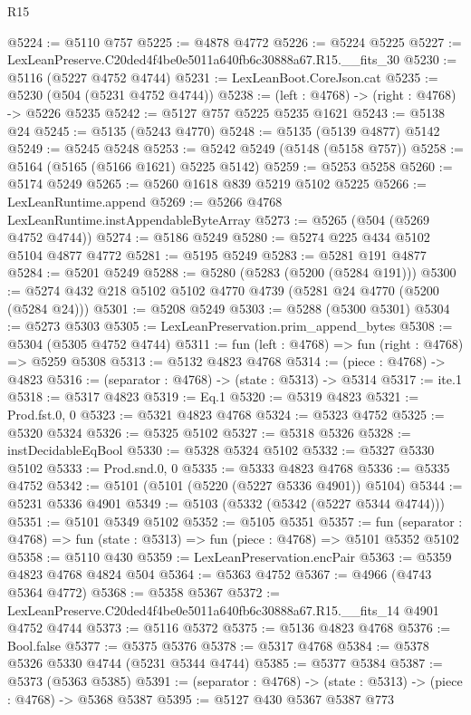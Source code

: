 \begin{lexlean}{R15}
\begin{coremodule}
{{{{{{{{{{{@5224 := @5110 @757
@5225 := @4878 @4772
@5226 := @5224 @5225
@5227 := LexLeanPreserve.C20ded4f4be0e5011a640fb6c30888a67.R15.__fits_30
@5230 := @5116 (@5227 @4752 @4744)
@5231 := LexLeanBoot.CoreJson.cat
@5235 := @5230 (@504 (@5231 @4752 @4744))
@5238 := (left : @4768) -> (right : @4768) -> @5226 @5235
@5242 := @5127 @757 @5225 @5235 @1621
@5243 := @5138 @24
@5245 := @5135 (@5243 @4770)
@5248 := @5135 (@5139 @4877) @5142
@5249 := @5245 @5248
@5253 := @5242 @5249 (@5148 (@5158 @757))
@5258 := @5164 (@5165 (@5166 @1621) @5225 @5142)
@5259 := @5253 @5258
@5260 := @5174 @5249
@5265 := @5260 @1618 @839 @5219 @5102 @5225
@5266 := LexLeanRuntime.append
@5269 := @5266 @4768 LexLeanRuntime.instAppendableByteArray
@5273 := @5265 (@504 (@5269 @4752 @4744))
@5274 := @5186 @5249
@5280 := @5274 @225 @434 @5102 @5104 @4877 @4772
@5281 := @5195 @5249
@5283 := @5281 @191 @4877
@5284 := @5201 @5249
@5288 := @5280 (@5283 (@5200 (@5284 @191)))
@5300 := @5274 @432 @218 @5102 @5102 @4770 @4739 (@5281 @24 @4770 (@5200 (@5284 @24)))
@5301 := @5208 @5249
@5303 := @5288 (@5300 @5301)
@5304 := @5273 @5303
@5305 := LexLeanPreservation.prim_append_bytes
@5308 := @5304 (@5305 @4752 @4744)
@5311 := fun (left : @4768) => fun (right : @4768) => @5259 @5308
@5313 := @5132 @4823 @4768
@5314 := (piece : @4768) -> @4823
@5316 := (separator : @4768) -> (state : @5313) -> @5314
@5317 := ite.{1}
@5318 := @5317 @4823
@5319 := Eq.{1}
@5320 := @5319 @4823
@5321 := Prod.fst.{0, 0}
@5323 := @5321 @4823 @4768
@5324 := @5323 @4752
@5325 := @5320 @5324
@5326 := @5325 @5102
@5327 := @5318 @5326
@5328 := instDecidableEqBool
@5330 := @5328 @5324 @5102
@5332 := @5327 @5330 @5102
@5333 := Prod.snd.{0, 0}
@5335 := @5333 @4823 @4768
@5336 := @5335 @4752
@5342 := @5101 (@5101 (@5220 (@5227 @5336 @4901)) @5104)
@5344 := @5231 @5336 @4901
@5349 := @5103 (@5332 (@5342 (@5227 @5344 @4744)))
@5351 := @5101 @5349 @5102
@5352 := @5105 @5351
@5357 := fun (separator : @4768) => fun (state : @5313) => fun (piece : @4768) => @5101 @5352 @5102
@5358 := @5110 @430
@5359 := LexLeanPreservation.encPair
@5363 := @5359 @4823 @4768 @4824 @504
@5364 := @5363 @4752
@5367 := @4966 (@4743 @5364 @4772)
@5368 := @5358 @5367
@5372 := LexLeanPreserve.C20ded4f4be0e5011a640fb6c30888a67.R15.__fits_14 @4901 @4752 @4744
@5373 := @5116 @5372
@5375 := @5136 @4823 @4768
@5376 := Bool.false
@5377 := @5375 @5376
@5378 := @5317 @4768
@5384 := @5378 @5326 @5330 @4744 (@5231 @5344 @4744)
@5385 := @5377 @5384
@5387 := @5373 (@5363 @5385)
@5391 := (separator : @4768) -> (state : @5313) -> (piece : @4768) -> @5368 @5387
@5395 := @5127 @430 @5367 @5387 @773
}}}}}}}}}}}
\end{coremodule}
\end{lexlean}
